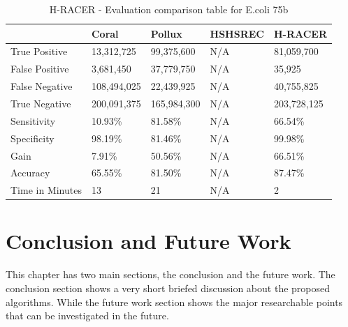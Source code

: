 \documentclass[12pt,openany]{llncs}
\begin{document}
\begingroup
\renewcommand\arraystretch{3}
\begin{longtable}{|m{33mm}|m{20mm}|m{20mm}|m{20mm}|m{20mm}|}
        \caption{\label{tab:eval-4}H-RACER - Evaluation comparison table for E.coli 75b}\\
        \hline
           & Coral & Pollux & HSHSREC & H-RACER\cellcolor{DarkGray} \\ %
        \hline
           True Positive & 13,312,725 & 99,375,600 & N/A & 81,059,700\cellcolor{LightGray} \\ %
        \hline
           False Positive & 3,681,450 & 37,779,750 & N/A & 35,925\cellcolor{LightGray} \\ %
        \hline
           False Negative & 108,494,025 & 22,439,925 & N/A & 40,755,825\cellcolor{LightGray} \\ %
        \hline
           True Negative & 200,091,375 & 165,984,300 & N/A & 203,728,125\cellcolor{LightGray} \\ %
        \hline
           Sensitivity & 10.93\% & 81.58\% & N/A & 66.54\%\cellcolor{LightGray} \\ %
        \hline
           Specificity & 98.19\% & 81.46\% & N/A & 99.98\%\cellcolor{LightGray} \\ %
        \hline
           Gain & 7.91\% & 50.56\% & N/A & 66.51\%\cellcolor{LightGray} \\ %
        \hline
           Accuracy & 65.55\% & 81.50\% & N/A & 87.47\%\cellcolor{LightGray} \\ %
        \hline
           Time in Minutes& 13 & 21 & N/A & 2\cellcolor{LightGray} \\ %
        \hline
\end{longtable}
\endgroup

\newpage
\chapter{\label{chap:7}Conclusion and Future Work}
This chapter has two main sections, the conclusion and the future work. The conclusion section shows a very short briefed discussion about the proposed algorithms. While the future work section shows the major researchable points that can be investigated in the future.
\end{document}
